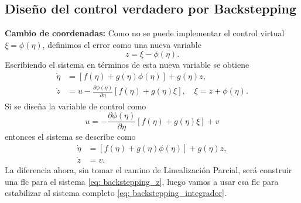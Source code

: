 \subsection{Diseño del control verdadero por Backstepping}
\textbf{Cambio de coordenadas:} Como no se puede implementar el control virtual $\xi = \phi(\eta)$, definimos el error como una nueva variable
\begin{equation*}
	z = \xi - \phi(\eta).
\end{equation*}
Escribiendo el sistema en términos de esta nueva variable se obtiene
\begin{equation*}
	\begin{aligned}
		\dot{\eta} & = [f(\eta) + g(\eta)\phi(\eta)] + g(\eta)z,                                                         \\
		\dot{z}    & = u - \frac{\partial \phi(\eta)}{\partial \eta} [f(\eta) + g(\eta)\xi], \quad \xi = z + \phi(\eta).
	\end{aligned}
\end{equation*}
Si se diseña la variable de control como
\begin{equation*}
	u = -\dfrac{\partial \phi(\eta)}{\partial \eta} [f(\eta) + g(\eta)\xi] + v
\end{equation*}
entonces el sistema se describe como
\begin{equation}
	\begin{aligned}
		\dot{\eta} & = [f(\eta) + g(\eta)\phi(\eta)] + g(\eta)z, \\
		\dot{z}    & = v.
	\end{aligned}
	\label{eq: backstepping_z}
\end{equation}
La diferencia ahora, sin tomar el camino de Linealización Parcial, será construir una \gls{flc} para el sistema \eqref{eq: backstepping_z}, luego vamos a usar esa \gls{flc} para estabilizar al sistema completo \eqref{eq: backstepping_integrador}.

